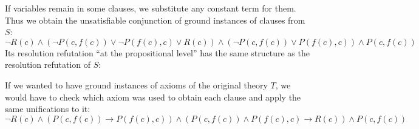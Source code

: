 \begin{problem}
\begin{solution}
\begin{enumerate}[(a)]
            If variables remain in some clauses, we substitute any constant term for them. Thus we obtain the unsatisfiable conjunction of ground instances of clauses from $S$:
            $$
            \neg R(c)\land (\neg P(c,f(c))\lor \neg P(f(c),c)\lor R(c))\land (\neg P(c,f(c))\lor P(f(c),c))\land P(c,f(c))
            $$
            Its resolution refutation ``at the propositional level'' has the same structure as the resolution refutation of $S$:
                              
            \begin{minipage}{0.6\textwidth}
            \end{minipage}%
            \begin{minipage}{0.35\textwidth}
            \end{minipage} 
            If we wanted to have ground instances of axioms of the original theory $T$, we would have to check which axiom was used to obtain each clause and apply the same unifications to it:
            $$
            \neg R(c)\land (P(c,f(c))\to P(f(c),c))\land (P(c,f(c))\land P(f(c),c)\to R(c))\land P(c,f(c))
            $$


        \end{enumerate}

    \end{solution}

\end{problem}

